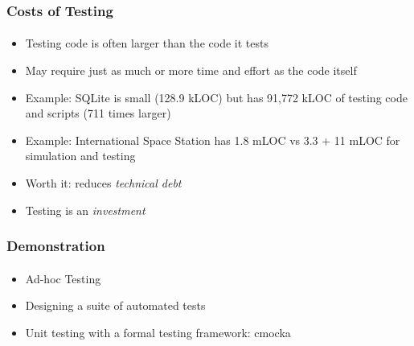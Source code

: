 \documentclass[]{beamer}
\begin{document}
\begin{frame}
    \frametitle{Costs of Testing}
    \framesubtitle{}

\begin{itemize}[<+->]  
  \item Testing code is often larger than the code it tests
  \item May require just as much or more time and effort as the code itself
  \item Example: SQLite is small (128.9 kLOC) but has 91,772 kLOC of testing code and scripts (711 times larger)
  \item Example: International Space Station has 1.8 mLOC vs 3.3 + 11 mLOC for simulation and testing
  \item Worth it: reduces \emph{technical debt}
  \item Testing is an \emph{investment}
\end{itemize}  

\end{frame}

\begin{frame}
    \frametitle{Demonstration}
    \framesubtitle{}


\begin{itemize}
  \item Ad-hoc Testing %
  \item Designing a suite of automated tests
  \item Unit testing with a formal testing framework: cmocka
\end{itemize}

\end{frame}
\end{document}
